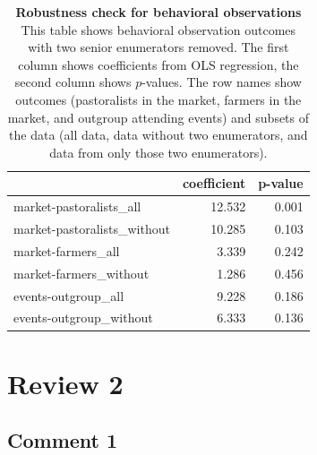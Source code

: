 \documentclass[
]{article}
\begin{document}
\begin{table}[H]
\begin{center}
\label{tab:behObs_enumsCheck_tab}
\caption{\textbf{Robustness check for behavioral observations} This table shows behavioral observation outcomes with two senior enumerators removed. The first column shows coefficients from OLS regression, the second column shows $p$-values. The row names show outcomes (pastoralists in the market, farmers in the market, and outgroup attending events) and subsets of the data (all data, data without two enumerators, and data from only those two enumerators).}
\smallskip

\begin{tabular}{l|r|r}
\hline
  & coefficient & p-value\\
\hline
market-pastoralists\_all & 12.532 & 0.001\\
\hline
market-pastoralists\_without & 10.285 & 0.103\\
\hline
market-farmers\_all & 3.339 & 0.242\\
\hline
market-farmers\_without & 1.286 & 0.456\\
\hline
events-outgroup\_all & 9.228 & 0.186\\
\hline
events-outgroup\_without & 6.333 & 0.136\\
\hline
\end{tabular}


\end{center}
\end{table}

\hypertarget{review-2}{%
\section{Review 2}\label{review-2}}

\hypertarget{comment-1-1}{%
\subsection{Comment 1}\label{comment-1-1}}
\end{document}
